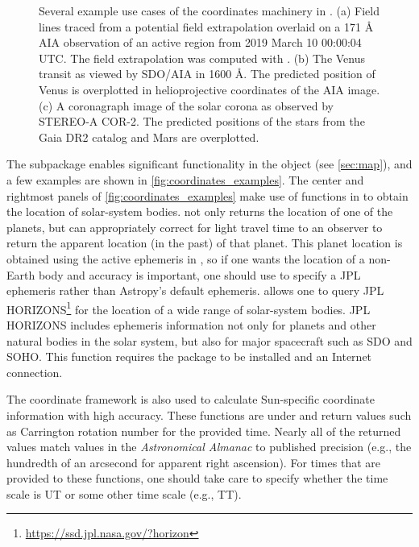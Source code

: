 \begin{figure}
    \caption{Several example use cases of the coordinates machinery in \sunpy.
    (a) Field lines traced from a potential field extrapolation overlaid on a 171 \AA{} AIA observation of an active region from 2019 March 10 00:00:04 UTC.
    The field extrapolation was computed with  \citep{david_stansby_2019_3237053}.
    (b) The Venus transit as viewed by SDO/AIA in 1600 \AA. The predicted position of Venus is overplotted in helioprojective coordinates of the AIA image.
    (c) A coronagraph image of the solar corona as observed by STEREO-A COR-2. The predicted positions of the stars from the Gaia DR2 catalog and Mars are overplotted.}
    \label{fig:coordinates_examples}
\end{figure}

The  subpackage enables significant functionality in the  object (see \autoref{sec:map}), and a few examples are shown in \autoref{fig:coordinates_examples}.
The center and rightmost panels of \autoref{fig:coordinates_examples} make use of functions in  to obtain the location of solar-system bodies.
 not only returns the location of one of the planets, but can appropriately correct for light travel time to an observer to return the apparent location (in the past) of that planet.
This planet location is obtained using the active ephemeris in , so if one wants the location of a non-Earth body and accuracy is important, one should use  to specify a JPL ephemeris rather than Astropy's default ephemeris.
 allows one to query JPL HORIZONS\footnote{\url{https://ssd.jpl.nasa.gov/?horizon}} for the location of a wide range of solar-system bodies.
JPL HORIZONS includes ephemeris information not only for planets and other natural bodies in the solar system, but also for major spacecraft such as SDO and SOHO.
This function requires the  package \citep{ginsburg_astroquery_2019} to be installed and an Internet connection.

The coordinate framework is also used to calculate Sun-specific coordinate information with high accuracy.
These functions are under  and return values such as Carrington rotation number for the provided time.
Nearly all of the returned values match values in the \textit{Astronomical Almanac} to published precision (e.g., the hundredth of an arcsecond for apparent right ascension).
For times that are provided to these functions, one should take care to specify whether the time scale is UT or some other time scale (e.g., TT).

